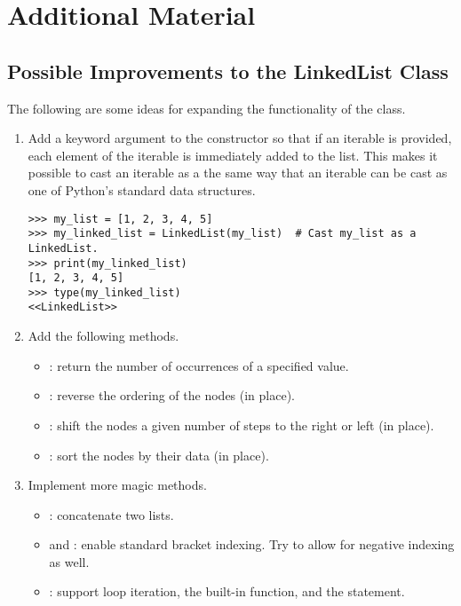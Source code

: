 \newpage

\section*{Additional Material} %

\subsection*{Possible Improvements to the LinkedList Class} %

The following are some ideas for expanding the functionality of the  class.

\begin{enumerate}
\item Add a keyword argument to the constructor so that if an iterable is provided, each element of the iterable is immediately added to the list.
This makes it possible to cast an iterable as a  the same way that an iterable can be cast as one of Python's standard data structures.

\begin{lstlisting}
>>> my_list = [1, 2, 3, 4, 5]
>>> my_linked_list = LinkedList(my_list)  # Cast my_list as a LinkedList.
>>> print(my_linked_list)
[1, 2, 3, 4, 5]
>>> type(my_linked_list)
<<LinkedList>>
\end{lstlisting}

\item Add the following methods.
\begin{itemize}
\item {}: return the number of occurrences of a specified value.
\item {}: reverse the ordering of the nodes (in place).
\item {}: shift the nodes a given number of steps to the right or left (in place).
\item {}: sort the nodes by their data (in place).
\end{itemize}

\item Implement more magic methods.
\begin{itemize}
\item {}: concatenate two lists.
\item {} and : enable standard bracket indexing.
Try to allow for negative indexing as well.
\item {}: support  loop iteration, the  built-in function, and the  statement.
\end{itemize}
\end{enumerate}

